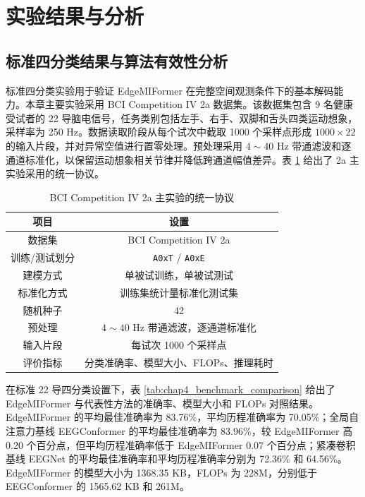 \section{实验结果与分析}
\subsection{标准四分类结果与算法有效性分析}
标准四分类实验用于验证 EdgeMIFormer 在完整空间观测条件下的基本解码能力。本章主要实验采用 BCI Competition IV 2a 数据集。该数据集包含 9 名健康受试者的 22 导脑电信号，任务类别包括左手、右手、双脚和舌头四类运动想象，采样率为 250 Hz。数据读取阶段从每个试次中截取 1000 个采样点形成 $1000 \times 22$ 的输入片段，并对异常空值进行置零处理。预处理采用 $4\sim40$ Hz 带通滤波和逐通道标准化，以保留运动想象相关节律并降低跨通道幅值差异。表 \ref{tab:chap4_protocol} 给出了 2a 主实验采用的统一协议。

\begin{table}[htbp]
    \centering
    \caption{BCI Competition IV 2a 主实验的统一协议}
    \label{tab:chap4_protocol}
    \begin{tabular}{cc}
        \hline
        项目 & 设置 \\
        \hline
        数据集 & BCI Competition IV 2a \\
        训练/测试划分 & \texttt{A0xT} / \texttt{A0xE} \\
        建模方式 & 单被试训练，单被试测试 \\
        标准化方式 & 训练集统计量标准化测试集 \\
        随机种子 & 42 \\
        预处理 & $4\sim40$ Hz 带通滤波，逐通道标准化 \\
        输入片段 & 每试次 1000 个采样点 \\
        评价指标 & 分类准确率、模型大小、FLOPs、推理耗时 \\
        \hline
    \end{tabular}
\end{table}

在标准 22 导四分类设置下，表 \ref{tab:chap4_benchmark_comparison} 给出了 EdgeMIFormer 与代表性方法的准确率、模型大小和 FLOPs 对照结果。EdgeMIFormer 的平均最佳准确率为 83.76\%，平均历程准确率为 70.05\%；全局自注意力基线 EEGConformer 的平均最佳准确率为 83.96\%，较 EdgeMIFormer 高 0.20 个百分点，但平均历程准确率低于 EdgeMIFormer 0.07 个百分点；紧凑卷积基线 EEGNet 的平均最佳准确率和平均历程准确率分别为 72.36\% 和 64.56\%。EdgeMIFormer 的模型大小为 1368.35 KB，FLOPs 为 228M，分别低于 EEGConformer 的 1565.62 KB 和 261M。


